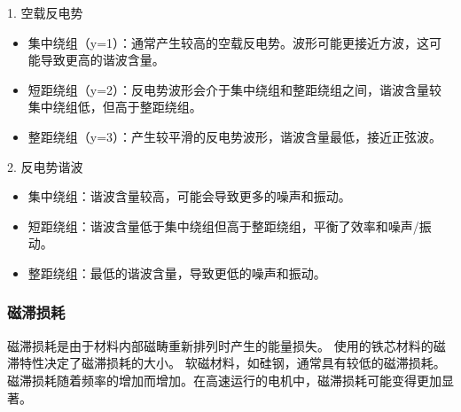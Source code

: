 \documentclass{thuemp}
\begin{document}
1. 空载反电势
\begin{itemize}
	\item 集中绕组（y=1）：通常产生较高的空载反电势。波形可能更接近方波，这可能导致更高的谐波含量。
	\item 短距绕组（y=2）：反电势波形会介于集中绕组和整距绕组之间，谐波含量较集中绕组低，但高于整距绕组。
	\item 整距绕组（y=3）：产生较平滑的反电势波形，谐波含量最低，接近正弦波。
\end{itemize}

2. 反电势谐波
\begin{itemize}
	\item 集中绕组：谐波含量较高，可能会导致更多的噪声和振动。
	\item 短距绕组：谐波含量低于集中绕组但高于整距绕组，平衡了效率和噪声/振动。
	\item 整距绕组：最低的谐波含量，导致更低的噪声和振动。
\end{itemize}

\subsubsection{磁滞损耗}
磁滞损耗是由于材料内部磁畴重新排列时产生的能量损失。
使用的铁芯材料的磁滞特性决定了磁滞损耗的大小。
软磁材料，如硅钢，通常具有较低的磁滞损耗。
磁滞损耗随着频率的增加而增加。在高速运行的电机中，磁滞损耗可能变得更加显著。
\end{document}
